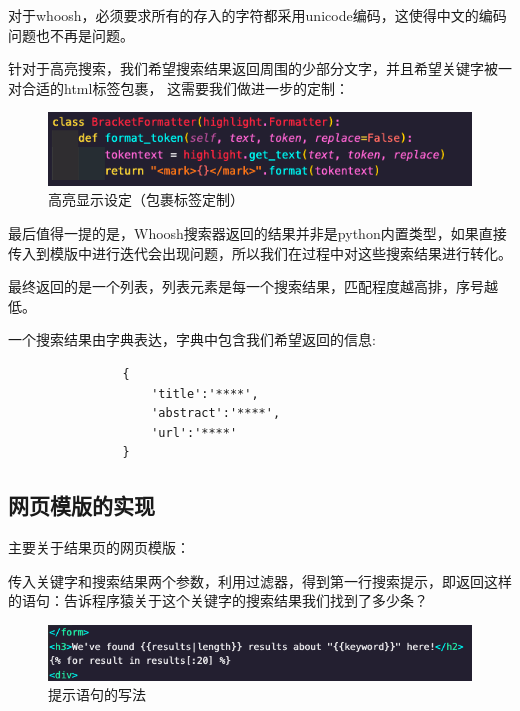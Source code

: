 \documentclass[UTF8]{ctexart}
\begin{document}
            对于whoosh，必须要求所有的存入的字符都采用unicode编码，这使得中文的编码问题也不再是问题。

            针对于高亮搜索，我们希望搜索结果返回周围的少部分文字，并且希望关键字被一对合适的html标签包裹，
            这需要我们做进一步的定制：
            \begin{figure}[ht]
                \centering
                \includegraphics[scale=0.6]{img/highlight.png}
                \caption{高亮显示设定（包裹标签定制）}
            \end{figure}

            最后值得一提的是，Whoosh搜索器返回的结果并非是python内置类型，如果直接传入到模版中进行迭代会出现问题，所以我们在过程中对这些搜索结果进行转化。

            最终返回的是一个列表，列表元素是每一个搜索结果，匹配程度越高排，序号越低。
            
            一个搜索结果由字典表达，字典中包含我们希望返回的信息:
            
            \begin{lstlisting}
                {
                    'title':'****',
                    'abstract':'****',
                    'url':'****'
                }
            \end{lstlisting}

        \subsection{网页模版的实现}
            主要关于结果页的网页模版：

            传入关键字和搜索结果两个参数，利用过滤器，得到第一行搜索提示，即返回这样的语句：告诉程序猿关于这个关键字的搜索结果我们找到了多少条？
            \begin{figure}[ht]
                \centering
                \includegraphics[scale=0.5]{img/tell.png}
                \caption{提示语句的写法}
            \end{figure}
\end{document}

